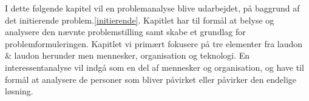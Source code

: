 I dette følgende kapitel vil en problemanalyse blive udarbejdet, på baggrund af det initierende problem.\ref{initierende}. Kapitlet har til formål at belyse og analysere den nævnte problemstilling samt skabe et grundlag for problemformuleringen. Kapitlet vi primært fokusere på tre elementer fra laudon \& laudon herunder men mennesker, organisation og teknologi. En interessentanalyse vil indgå som en del af mennesker og organisation, og have til formål at analysere de personer som bliver påvirket eller påvirker den endelige løsning. 
